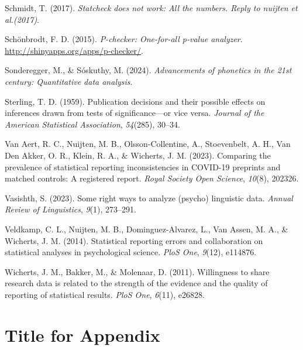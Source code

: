 \documentclass[
  doc,
  longtable,
  nolmodern,
  notxfonts,
  notimes,
  colorlinks=true,linkcolor=blue,citecolor=blue,urlcolor=blue]{apa7}
\newlength{\cslhangindent}
\newenvironment{CSLReferences}[2] %
 {\begin{list}{}{%
  \setlength{\itemindent}{0pt}
  \setlength{\leftmargin}{0pt}
  \setlength{\parsep}{0pt}
  \ifodd #1
   \setlength{\leftmargin}{\cslhangindent}
   \setlength{\itemindent}{-1\cslhangindent}
  \fi
  \setlength{\itemsep}{#2\baselineskip}}}
 {\end{list}}
\begin{document}
\begin{CSLReferences}{1}{0}
Schmidt, T. (2017). \emph{Statcheck does not work: All the numbers.
Reply to nuijten et al.(2017)}.

Schönbrodt, F. D. (2015). \emph{P-checker: One-for-all p-value
analyzer}. \url{http://shinyapps.org/apps/p-checker/}.

Sonderegger, M., \& Sóskuthy, M. (2024). \emph{Advancements of phonetics
in the 21st century: Quantitative data analysis}.

Sterling, T. D. (1959). Publication decisions and their possible effects
on inferences drawn from tests of significance---or vice versa.
\emph{Journal of the American Statistical Association}, \emph{54}(285),
30--34.

Van Aert, R. C., Nuijten, M. B., Olsson-Collentine, A., Stoevenbelt, A.
H., Van Den Akker, O. R., Klein, R. A., \& Wicherts, J. M. (2023).
Comparing the prevalence of statistical reporting inconsistencies in
COVID-19 preprints and matched controls: A registered report.
\emph{Royal Society Open Science}, \emph{10}(8), 202326.

Vasishth, S. (2023). Some right ways to analyze (psycho) linguistic
data. \emph{Annual Review of Linguistics}, \emph{9}(1), 273--291.

Veldkamp, C. L., Nuijten, M. B., Dominguez-Alvarez, L., Van Assen, M.
A., \& Wicherts, J. M. (2014). Statistical reporting errors and
collaboration on statistical analyses in psychological science.
\emph{PloS One}, \emph{9}(12), e114876.

Wicherts, J. M., Bakker, M., \& Molenaar, D. (2011). Willingness to
share research data is related to the strength of the evidence and the
quality of reporting of statistical results. \emph{PloS One},
\emph{6}(11), e26828.

\end{CSLReferences}

\appendix

\section{Title for Appendix}\label{title-for-appendix}
\end{document}
